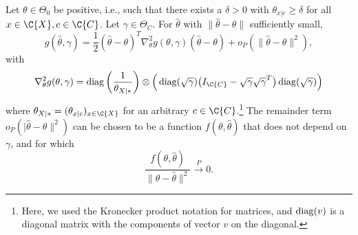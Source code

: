 \begin{Lem}\label{lem:g_derivatives_H0}
  Let $\theta \in \Theta_0$ be positive, i.e., such that there exists a $\delta > 0$ with $\theta_{x|c} \ge \delta$ for all $x \in \C{X}, c \in \C{C}$.
  Let $\gamma \in \Theta_C$.
  For $\hat\theta$ with $\lVert \hat\theta - \theta \rVert$ sufficiently small,
  \begin{equation}\label{eq:g_expansion}
    g(\hat\theta, \gamma) = \frac{1}{2} (\hat\theta - \theta)^T \nabla^2_\theta g(\theta,\gamma) (\hat\theta - \theta) + o_P(\lVert\hat\theta - \theta\rVert^2),
  \end{equation}
  with
  $$\nabla^2_{\theta} g(\theta,\gamma) 
    = \diag\bigg(\frac{1}{\theta_{X|\ast}}\bigg) \otimes \Big(\diag(\sqrt{\gamma}) \big(I_{\C{C}} - \sqrt{\gamma} \sqrt{\gamma}^T\big)\diag(\sqrt{\gamma})\Big)$$
  where $\theta_{X|\ast} = (\theta_{x|c})_{x\in\C{X}}$ for an arbitrary $c \in \C{C}$.\footnote{Here, we used the Kronecker product notation for matrices, and $\operatorname*{\mathrm{diag}}(v)$ is a diagonal matrix with the components of vector $v$ on the diagonal.}
  The remainder term $o_P(\lvert\hat\theta - \theta\rVert^2)$ can be chosen to be a function $f(\theta,\hat\theta)$ that does not depend on $\gamma$, and for which
  $$\frac{f(\theta,\hat\theta)}{\lVert\theta - \hat\theta\rVert^2} \stackrel{P}{\to} 0.$$
\end{Lem}
